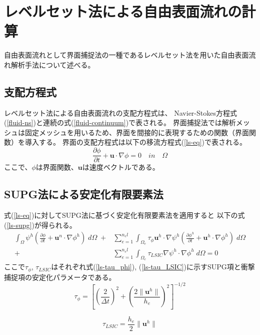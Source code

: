 \newpage
\section{レベルセット法による自由表面流れの計算}
自由表面流れとして界面捕捉法の一種であるレベルセット法を用いた自由表面流れ解析手法について述べる。

\subsection{支配方程式}
レベルセット法による自由表面流れの支配方程式は、
Navier-Stokes方程式(\ref{fluid-ns})と連続の式(\ref{fluid-continuum})で表される。
界面捕捉法では解析メッシュは固定メッシュを用いるため、界面を間接的に表現するための関数（界面関数）を導入する。
界面の支配方程式は以下の移流方程式(\ref{ls-eq})で表される。
\begin{equation}
\label{ls-eq}
	\frac{\partial \phi}{\partial t} + \bm{u} \cdot \nabla \phi = 0 \quad in \quad \Omega
\end{equation}
ここで、$\phi$は界面関数、$\bm{u}$は速度ベクトルである。

\subsection{SUPG法による安定化有限要素法}
式(\ref{ls-eq})に対してSUPG法に基づく安定化有限要素法を適用すると
以下の式(\ref{ls-supg})が得られる。
\begin{equation}
\label{ls-supg}
		\begin{split}
		\int_{\Omega} \psi^{h}\left( \frac{\partial \phi}{\partial t} + \bm{u}^{n} \cdot \nabla \phi^{h} \right) \; d\Omega \;+& 
		\sum^{n_el}_{e=1} \int_{\Omega_{e}} \tau_{\phi} \bm{u}^{h} \cdot \nabla \psi^{h} \left( \frac{\partial \phi^{h}}{\partial t} + \bm{u}^{h} \cdot \nabla \phi^{h} \right) \; d\Omega \\
		+& \sum^{n_el}_{e=1} \int_{\Omega_{e}} \tau_{LSIC} \nabla \psi^{h} \cdot \nabla \phi^{h} \; d\Omega = 0
	\end{split}
\end{equation}
ここで$\tau_\phi$, $\tau_{LSIC}$はそれぞれ式(\ref{ls-tau_phi}), (\ref{ls-tau_LSIC})に示すSUPG項と衝撃捕捉項の安定化パラメータである。
\begin{equation}
\label{ls-tau_phi}
	\tau_{\phi} = \left[ \left(\frac{2}{\Delta t} \right)^2 + \left(\frac{2 \| \bm{u}^{h} \|}{h_{e}} \right)^2 \right]^{-1/2}
\end{equation}

\begin{equation}
\label{ls-tau_LSIC}
	\tau_{LSIC} = \frac{h_{e}}{2} \| \bm{u}^{h} \|
\end{equation}

